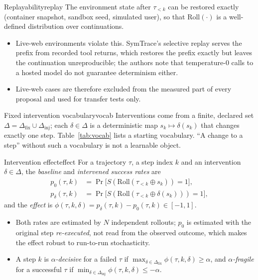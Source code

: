 \documentclass[10pt,a4paper]{article}
\begin{document}
\begin{assumption}{Replayability}{replay}
The environment state after $\tau_{<k}$ can be restored exactly (container snapshot, sandbox seed, simulated user), so that $\mathrm{Roll}(\cdot)$ is a well-defined distribution over continuations.
\begin{itemize}[leftmargin=1.1em]
\item Live-web environments violate this. SymTrace's selective replay \cite{luan2026symtrace} serves the prefix from recorded tool returns, which restores the prefix exactly but leaves the continuation unreproducible; the authors note that temperature-0 calls to a hosted model do not guarantee determinism either.
\item Live-web cases are therefore excluded from the measured part of every proposal and used for transfer tests only.
\end{itemize}
\end{assumption}

\begin{assumption}{Fixed intervention vocabulary}{vocab}
Interventions come from a finite, declared set $\Delta=\Delta_{\mathrm{fix}}\cup\Delta_{\mathrm{inj}}$; each $\delta\in\Delta$ is a deterministic map $s_k\mapsto\delta(s_k)$ that changes exactly one step. Table~\ref{tab:vocab} lists a starting vocabulary. ``A change to a step'' without such a vocabulary is not a learnable object.
\end{assumption}

\begin{definition}{Intervention effect}{effect}
For a trajectory $\tau$, a step index $k$ and an intervention $\delta\in\Delta$, the \emph{baseline} and \emph{intervened success rates} are
\begin{align*}
p_0(\tau,k)&=\Pr\big[S(\mathrm{Roll}(\tau_{<k}\oplus s_k))=1\big],\\
p_\delta(\tau,k)&=\Pr\big[S(\mathrm{Roll}(\tau_{<k}\oplus\delta(s_k)))=1\big],
\end{align*}
and the \emph{effect} is $\phi(\tau,k,\delta)=p_\delta(\tau,k)-p_0(\tau,k)\in[-1,1]$.
\begin{itemize}[leftmargin=1.1em]
\item Both rates are estimated by $N$ independent rollouts; $p_0$ is estimated with the original step \emph{re-executed}, not read from the observed outcome, which makes the effect robust to run-to-run stochasticity.
\item A step $k$ is \emph{$\alpha$-decisive} for a failed $\tau$ if $\max_{\delta\in\Delta_{\mathrm{fix}}}\phi(\tau,k,\delta)\ge\alpha$, and \emph{$\alpha$-fragile} for a successful $\tau$ if $\min_{\delta\in\Delta_{\mathrm{inj}}}\phi(\tau,k,\delta)\le-\alpha$.
\end{itemize}
\end{definition}
\end{document}

